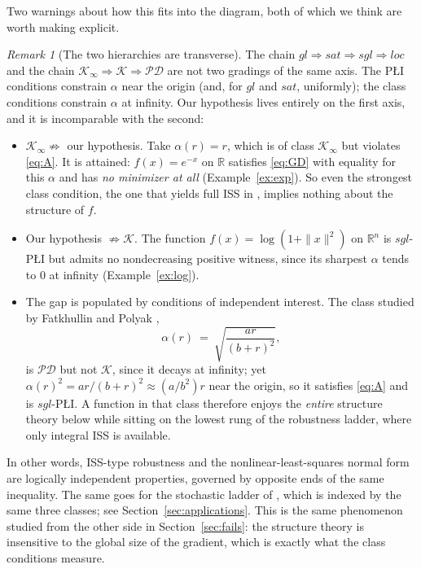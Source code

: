 \documentclass[11pt]{article}
\theoremstyle{plain}
\theoremstyle{definition}
\theoremstyle{remark}
\newtheorem{rem}[thm]{Remark}
\newcommand{\R}{\mathbb{R}}
\begin{document}
Two warnings about how this fits into the diagram, both of which we think are
worth making explicit.

\begin{rem}[The two hierarchies are transverse]\label{rem:transverse}
The chain $gl\Rightarrow sat\Rightarrow sgl\Rightarrow loc$ and the chain
$\mathcal{K}_\infty\Rightarrow\mathcal{K}\Rightarrow\mathcal{PD}$ are not two
gradings of the same axis. The P\L{}I conditions constrain $\alpha$ near the
origin (and, for $gl$ and $sat$, uniformly); the class conditions constrain
$\alpha$ at infinity. Our hypothesis lives entirely on the first axis, and it is
incomparable with the second:
\begin{itemize}
\item $\mathcal{K}_\infty \not\Rightarrow$ our hypothesis. Take
$\alpha(r)=r$, which is of class $\mathcal{K}_\infty$ but violates \eqref{eq:A}.
It is attained: $f(x)=e^{-x}$ on $\R$ satisfies \eqref{eq:GD} with equality for
this $\alpha$ and has \emph{no minimizer at all} (Example~\ref{ex:exp}). So even
the strongest class condition, the one that yields full ISS in
\cite{Sontag2025L4DC}, implies nothing about the structure of $f$.
\item Our hypothesis $\not\Rightarrow\mathcal{K}$. The function
$f(x)=\log(1+\|x\|^2)$ on $\R^n$ is $sgl$-P\L{}I but admits no nondecreasing
positive witness, since its sharpest $\alpha$ tends to $0$ at infinity
(Example~\ref{ex:log}).
\item The gap is populated by conditions of independent interest. The class
studied by Fatkhullin and Polyak \cite{FatkhullinPolyak2021},
\[
  \alpha(r) \ =\ \sqrt{\frac{ar}{(b+r)^2}} ,
\]
is $\mathcal{PD}$ but not $\mathcal{K}$, since it decays at infinity; yet
$\alpha(r)^2 = ar/(b+r)^2 \approx (a/b^2)r$ near the origin, so it satisfies
\eqref{eq:A} and is $sgl$-P\L{}I. A function in that class therefore enjoys the
\emph{entire} structure theory below while sitting on the lowest rung of the
robustness ladder, where only integral ISS is available.
\end{itemize}
In other words, ISS-type robustness and the nonlinear-least-squares normal form
are logically independent properties, governed by opposite ends of the same
inequality. The same goes for the stochastic ladder of \cite{CuiJiangSontag2026},
which is indexed by the same three classes; see Section~\ref{sec:applications}.
This is the same phenomenon studied from the other side in
Section~\ref{sec:fails}: the structure theory is insensitive to the global size
of the gradient, which is exactly what the class conditions measure.
\end{rem}
\end{document}
